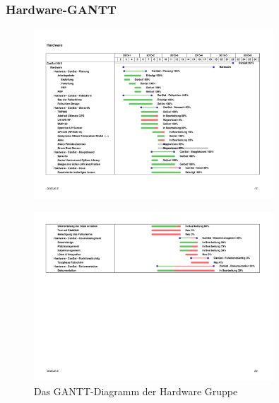\subsubsection {Hardware-GANTT}
\begin{figure}[htbp]
	\centering
	\includegraphics[trim = 10mm 50mm 20mm 65mm, clip,width=0.8\textwidth]{8_Anhang/hardware-gantt-1.png}
	\label{gantt_hardware_1}
\end{figure}
\vspace{-2cm}
\begin{figure}[htbp]
	\centering
	\includegraphics[trim = 11mm 350mm 20mm 40mm, clip,width=0.8\textwidth]{8_Anhang/hardware-gantt-2.png}
	\caption{Das GANTT-Diagramm der Hardware Gruppe}
	\label{gantt_hardware_2}
\end{figure}

\newpage
